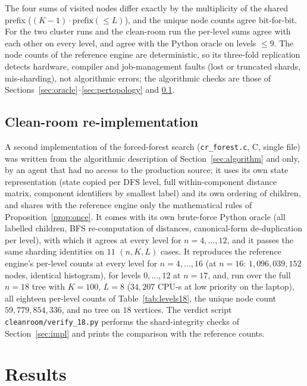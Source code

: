 \documentclass[11pt,a4paper]{article}
\theoremstyle{plain}
\theoremstyle{remark}
\newcommand{\file}[1]{\texttt{#1}}
\begin{document}
The four sums of visited nodes differ exactly by the multiplicity of the shared
prefix ($(K-1)\cdot\mathrm{prefix}(\le L)$), and the unique node counts agree
bit-for-bit.  For the two cluster runs and the clean-room run the per-level
sums agree with each other on every level, and agree with the Python oracle on
levels $\le 9$.  The node counts of the reference engine are deterministic, so
its three-fold replication detects hardware, compiler and job-management faults
(lost or truncated shards, mis-sharding), not algorithmic errors; the
algorithmic checks are those of Sections~\ref{sec:oracle}--\ref{sec:pertopology}
and \ref{sec:cleanroom}.

\subsection{Clean-room re-implementation}\label{sec:cleanroom}

A second implementation of the forced-forest search (\file{cr\_forest.c}, C,
single file) was written from the algorithmic description of
Section~\ref{sec:algorithm} and \cite{Calhoun2007} only, by an agent that had
no access to the production source; it uses its own state representation
(state copied per DFS level, full within-component distance matrix, component
identifiers by smallest label) and its own ordering of children, and shares
with the reference engine only the mathematical rules of
Proposition~\ref{prop:once}.  It comes with its own brute-force Python oracle
(all labelled children, BFS re-computation of distances, canonical-form
de-duplication per level), with which it agrees at every level for $n=4,\dots,12$,
and it passes the same sharding identities on $11$ $(n,K,L)$ cases.  It
reproduces the reference engine's per-level counts at every level for
$n=4,\dots,16$ (at $n=16$: $1{,}096{,}039{,}152$ nodes, identical histogram),
for levels $0,\dots,12$ at $n=17$, and, run over the full $n=18$ tree with
$K=100$, $L=8$ ($34{,}207$ CPU-s at low priority on the laptop), all eighteen
per-level counts of Table~\ref{tab:levels18}, the unique node count
$59{,}779{,}854{,}336$, and no tree on $18$ vertices.  The verdict script
\file{cleanroom/verify\_18.py} performs the shard-integrity checks of
Section~\ref{sec:impl} and prints the comparison with the reference counts.

\section{Results}\label{sec:results}
\end{document}
